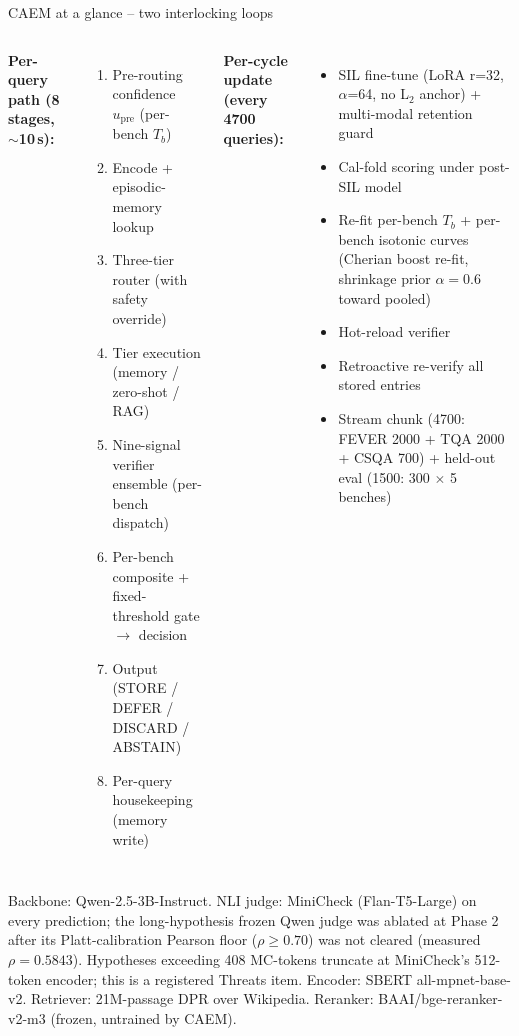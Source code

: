\documentclass[10pt,aspectratio=169]{beamer}
\begin{document}
\begin{frame}{CAEM at a glance -- two interlocking loops}
  \begin{columns}[t]
    \textbf{Per-query path (8 stages, $\sim$10\,s):}
    \begin{enumerate}\setlength\itemsep{0pt}\scriptsize
      \item Pre-routing confidence $u_{\text{pre}}$ (per-bench $T_b$)
      \item Encode + episodic-memory lookup
      \item Three-tier router (with safety override)
      \item Tier execution (memory / zero-shot / RAG)
      \item Nine-signal verifier ensemble (per-bench dispatch)
      \item Per-bench composite + fixed-threshold gate $\to$ decision
      \item Output (STORE / DEFER / DISCARD / ABSTAIN)
      \item Per-query housekeeping (memory write)
    \end{enumerate}

    \textbf{Per-cycle update (every 4700 queries):}
    \begin{itemize}\setlength\itemsep{0pt}\scriptsize
      \item SIL fine-tune (LoRA r=32, $\alpha$=64, no L$_2$ anchor) + multi-modal retention guard
      \item Cal-fold scoring under post-SIL model
      \item Re-fit per-bench $T_b$ + per-bench isotonic curves (Cherian boost re-fit, shrinkage prior $\alpha{=}0.6$ toward pooled)
      \item Hot-reload verifier
      \item Retroactive re-verify all stored entries
      \item Stream chunk (4700: FEVER 2000 + TQA 2000 + CSQA 700) + held-out eval (1500: 300 $\times$ 5 benches)
    \end{itemize}
  \end{columns}

  \vspace{0.4em}
  {\scriptsize Backbone: Qwen-2.5-3B-Instruct. NLI judge: MiniCheck (Flan-T5-Large) on every prediction; the long-hypothesis frozen Qwen judge was ablated at Phase 2 after its Platt-calibration Pearson floor ($\rho \ge 0.70$) was not cleared (measured $\rho = 0.5843$). Hypotheses exceeding 408 MC-tokens truncate at MiniCheck's 512-token encoder; this is a registered Threats item. Encoder: SBERT all-mpnet-base-v2. Retriever: 21M-passage DPR over Wikipedia. Reranker: BAAI/bge-reranker-v2-m3 (frozen, untrained by CAEM).}
\end{frame}
\end{document}
